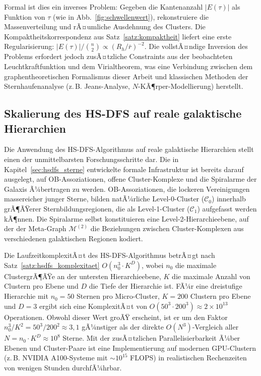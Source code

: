 ﻿\documentclass[a4paper,12pt]{report}
\theoremstyle{definition}
\begin{document}
Formal ist dies ein inverses Problem: Gegeben die Kantenanzahl $|E(\tau)|$ als Funktion von $\tau$ (wie in Abb.~\ref{fig:schwellenwert}), rekonstruiere die Massenverteilung und rÃ¤umliche Ausdehnung des Clusters. Die Kompaktheitskorrespondenz aus Satz~\ref{satz:kompaktheit} liefert eine erste Regularisierung: $|E(\tau)| / \binom{n}{2} \propto (R_h / \bar{r})^{-2}$. Die vollstÃ¤ndige Inversion des Problems erfordert jedoch zusÃ¤tzliche Constraints aus der beobachteten Leuchtkraftfunktion und dem Virialtheorem, was eine Verbindung zwischen dem graphentheoretischen Formalismus dieser Arbeit und klassischen Methoden der Sternhaufenanalyse (z.\,B. Jeans-Analyse, $N$-KÃ¶rper-Modellierung) herstellt.


\subsection{Skalierung des HS-DFS auf reale galaktische Hierarchien}

Die Anwendung des HS-DFS-Algorithmus auf reale galaktische Hierarchien stellt einen der unmittelbarsten Forschungsschritte dar. Die in Kapitel~\ref{sec:hsdfs_sterne} entwickelte formale Infrastruktur ist bereits darauf ausgelegt, auf OB-Assoziationen, offene Cluster-Komplexe und die Spiralarme der Galaxis Ã¼bertragen zu werden. OB-Assoziationen, die lockeren Vereinigungen massereicher junger Sterne, bilden natÃ¼rliche Level-0-Cluster ($\mathcal{C}_0$) innerhalb grÃ¶ÃŸerer Sternbildungsregionen, die als Level-1-Cluster ($\mathcal{C}_1$) aufgefasst werden kÃ¶nnen. Die Spiralarme selbst konstituieren eine Level-2-Hierarchieebene, auf der der Meta-Graph $\mathcal{M}^{(2)}$ die Beziehungen zwischen Cluster-Komplexen aus verschiedenen galaktischen Regionen kodiert.

Die LaufzeitkomplexitÃ¤t des HS-DFS-Algorithmus betrÃ¤gt nach Satz~\ref{satz:hsdfs_komplexitaet} $O(n_0^3 \cdot K^D)$, wobei $n_0$ die maximale ClustergrÃ¶ÃŸe an der untersten Hierarchieebene, $K$ die maximale Anzahl von Clustern pro Ebene und $D$ die Tiefe der Hierarchie ist. FÃ¼r eine dreistufige Hierarchie mit $n_0 = 50$ Sternen pro Micro-Cluster, $K = 200$ Clustern pro Ebene und $D = 3$ ergibt sich eine KomplexitÃ¤t von $O(50^3 \cdot 200^3) \approx 2 \times 10^{13}$ Operationen. Obwohl dieser Wert groÃŸ erscheint, ist er um den Faktor $n_0^3 / K^2 = 50^3 / 200^2 \approx 3{,}1$ gÃ¼nstiger als der direkte $O(N^3)$-Vergleich aller $N = n_0 \cdot K^D \approx 10^8$ Sterne. Mit der zusÃ¤tzlichen Parallelisierbarkeit Ã¼ber Ebenen und Cluster-Paare ist eine Implementierung auf modernen GPU-Clustern (z.\,B. NVIDIA A100-Systeme mit $\sim 10^{15}$ FLOPS) in realistischen Rechenzeiten von wenigen Stunden durchfÃ¼hrbar.
\end{document}
